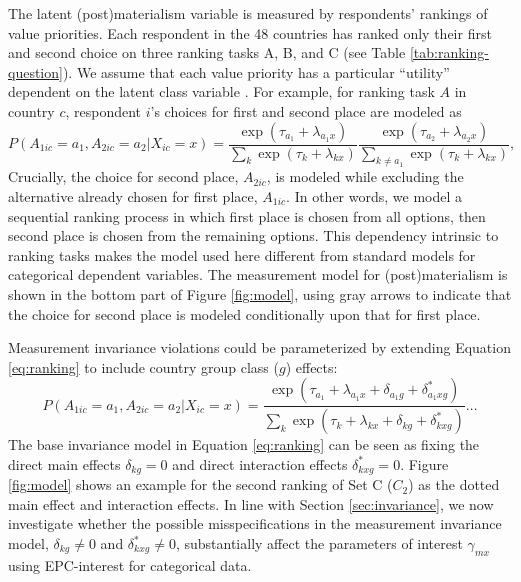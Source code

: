 \documentclass[letterpaper,12pt]{article}
\begin{document}
The latent (post)materialism variable is measured by respondents' rankings of value priorities.
Each respondent in the 48 countries has ranked only their first and second choice on three ranking tasks A, B, and C (see Table \ref{tab:ranking-question}). We assume that each value priority has a particular ``utility'' \citep[p. 171]{luce1959individual,bockenholt2002comparison} dependent on the latent class variable  \citep[p. 172]{croon1989latent,bockenholt2002comparison}.  For example, for ranking task $A$ in country $c$, respondent $i$'s  choices for first and second place are modeled as
 \begin{equation}
	P(A_{1ic} = a_1, A_{2ic} = a_2 | X_{ic} = x) = 
		\frac{\exp(\tau_{a_1} + \lambda_{a_1 x})}{\sum_{k} \exp(\tau_{k} + \lambda_{k x})}
		\frac{\exp(\tau_{a_2} + \lambda_{a_2 x})}{\sum_{k \neq a_1}
			\exp(\tau_{k} + \lambda_{k x})},
				\label{eq:ranking}
\end{equation}
Crucially, the choice for second place, $A_{2ic}$, is modeled while excluding the alternative already chosen for first place, $A_{1ic}$. In other words, we model a sequential ranking process in which first place is chosen from all options, then second place is chosen from the remaining options. This dependency intrinsic to ranking tasks makes the model used here different from standard models for categorical dependent variables.
The measurement model for (post)materialism is shown in the bottom part of Figure \ref{fig:model}, using gray arrows to indicate that the choice for second place is modeled conditionally upon that for first place.

Measurement invariance violations could be parameterized by extending Equation  \ref{eq:ranking} to include country group class ($g$) effects:
\begin{equation}
P(A_{1ic} = a_1, A_{2ic} = a_2 | X_{ic} = x) = 
		\frac{\exp(\tau_{a_1} + \lambda_{a_1 x} + 
		\delta_{a_1 g} + \delta^{*}_{a_1 x g})}{\sum_{k} \exp(\tau_{k} + \lambda_{k x} + 
		\delta_{k g} + \delta^{*}_{k x g})}
		\ldots
			\label{eq:loglin-measurement-noninvariant}
\end{equation}
The base invariance model in Equation \ref{eq:ranking} can be seen as fixing the direct main effects $\delta_{k g} = 0$  and direct interaction effects $\delta^{*}_{k x g} = 0$. Figure \ref{fig:model}  shows an example for the second ranking of Set C ($C_2$) as the dotted main effect and interaction effects. In line with Section \ref{sec:invariance}, we now investigate whether the possible misspecifications in the measurement invariance model, $\delta_{k g} \neq 0$ and $\delta^{*}_{k x g} \neq 0$, substantially affect the parameters of interest $\gamma_{mx}$ using EPC-interest for categorical data.
\end{document}
